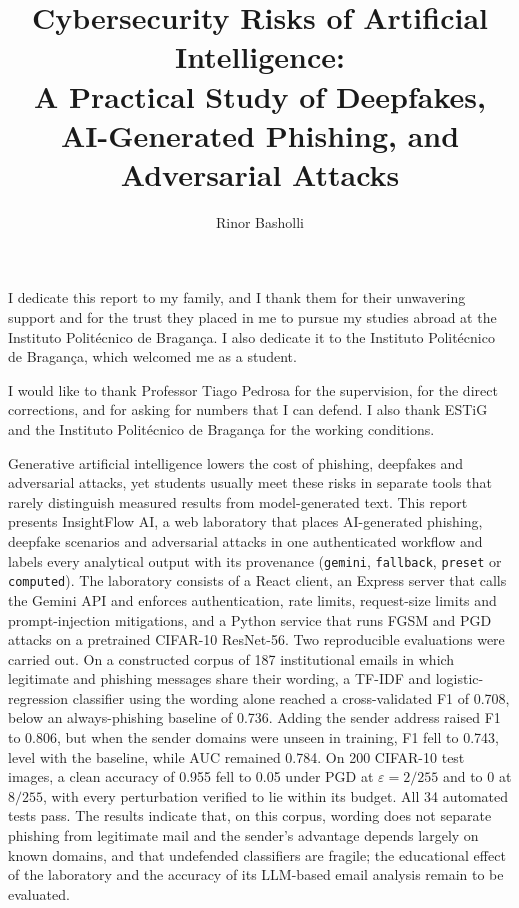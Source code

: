 \documentclass[a4paper,oneside]{report}
\begin{document}

\title{Cybersecurity Risks of Artificial Intelligence:\\[0.35em]
A Practical Study of Deepfakes,\\
AI-Generated Phishing, and Adversarial Attacks}
\author{Rinor Basholli}



\beforepreface

I dedicate this report to my family, and I thank them for their unwavering support and for the trust they placed in me to pursue my studies abroad at the Instituto Politécnico de Bragança. I also dedicate it to the Instituto Politécnico de Bragança, which welcomed me as a student.

I would like to thank Professor Tiago Pedrosa for the supervision, for the direct corrections, and for asking for numbers that I can defend. I also thank ESTiG and the Instituto Politécnico de Bragança for the working conditions.

Generative artificial intelligence lowers the cost of phishing, deepfakes and adversarial attacks, yet students usually meet these risks in separate tools that rarely distinguish measured results from model-generated text. This report presents InsightFlow AI, a web laboratory that places AI-generated phishing, deepfake scenarios and adversarial attacks in one authenticated workflow and labels every analytical output with its provenance (\texttt{gemini}, \texttt{fallback}, \texttt{preset} or \texttt{computed}). The laboratory consists of a React client, an Express server that calls the Gemini API and enforces authentication, rate limits, request-size limits and prompt-injection mitigations, and a Python service that runs FGSM and PGD attacks on a pretrained CIFAR-10 ResNet-56. Two reproducible evaluations were carried out. On a constructed corpus of 187 institutional emails in which legitimate and phishing messages share their wording, a TF-IDF and logistic-regression classifier using the wording alone reached a cross-validated F1 of 0.708, below an always-phishing baseline of 0.736. Adding the sender address raised F1 to 0.806, but when the sender domains were unseen in training, F1 fell to 0.743, level with the baseline, while AUC remained 0.784. On 200 CIFAR-10 test images, a clean accuracy of 0.955 fell to 0.05 under PGD at $\varepsilon = 2/255$ and to 0 at $8/255$, with every perturbation verified to lie within its budget. All 34 automated tests pass. The results indicate that, on this corpus, wording does not separate phishing from legitimate mail and the sender's advantage depends largely on known domains, and that undefended classifiers are fragile; the educational effect of the laboratory and the accuracy of its LLM-based email analysis remain to be evaluated.
\end{document}
